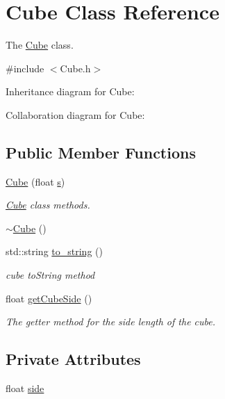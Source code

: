 \hypertarget{classCube}{}\section{Cube Class Reference}
\label{classCube}


The \hyperlink{classCube}{Cube} class.  




{\ttfamily \#include $<$Cube.\+h$>$}



Inheritance diagram for Cube\+:


Collaboration diagram for Cube\+:
\subsection*{Public Member Functions}
\begin{DoxyCompactItemize}
\item 
\hyperlink{classCube_a7f56a7208d6c1ba6120fa091d3c0cd7a}{Cube} (float \hyperlink{classContainer_a5f70d3b0713aff689d525e30ca1c9238}{s})
\begin{DoxyCompactList}\small\item\em \hyperlink{classCube}{Cube} class methods. \end{DoxyCompactList}\item 
\hyperlink{classCube_aa814e979cecb8c451fdb332ded2cea1e}{$\sim$\+Cube} ()
\item 
std\+::string \hyperlink{classCube_ae9140c70a224b9cdc972b223a9d13c80}{to\+\_\+string} ()
\begin{DoxyCompactList}\small\item\em cube to\+String method \end{DoxyCompactList}\item 
float \hyperlink{classCube_a88458f55307ccd9165f97cd598258be4}{get\+Cube\+Side} ()
\begin{DoxyCompactList}\small\item\em The getter method for the side length of the cube. \end{DoxyCompactList}\end{DoxyCompactItemize}
\subsection*{Private Attributes}
\begin{DoxyCompactItemize}
\item 
float \hyperlink{classCube_a2fd970f59cab380889a60c60e5b76593}{side}
\end{DoxyCompactItemize}
